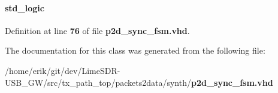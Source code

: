 \paragraph[{sync\+\_\+en\+\_\+vect\+\_\+shift}]{ {\bfseries \textcolor{comment}{std\+\_\+logic}\textcolor{vhdlchar}{ }} \hspace{0.3cm}{\ttfamily [Signal]}}\label{classp2d__sync__fsm_1_1arch_a5d1969593622f4bd80c03ec9d14254d4}


Definition at line {\bf 76} of file {\bf p2d\+\_\+sync\+\_\+fsm.\+vhd}.



The documentation for this class was generated from the following file\+:\begin{DoxyCompactItemize}
\item 
/home/erik/git/dev/\+Lime\+S\+D\+R-\/\+U\+S\+B\+\_\+\+G\+W/src/tx\+\_\+path\+\_\+top/packets2data/synth/{\bf p2d\+\_\+sync\+\_\+fsm.\+vhd}\end{DoxyCompactItemize}
